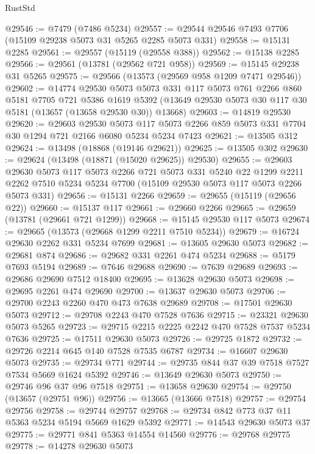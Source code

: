 \begin{lexlean}{RustStd}
\begin{coremodule}
@29546 := @7479 (@7486 @5234)
@29557 := @29544 @29546 @7493 @7706 (@15109 @29238 @5073 @31 @5265 @2285 @5073 @331)
@29558 := @15131 @2285
@29561 := @29557 (@15119 (@29558 @388))
@29562 := @15138 @2285
@29566 := @29561 (@13781 (@29562 @721 @958))
@29569 := @15145 @29238 @31 @5265
@29575 := @29566 (@13573 (@29569 @958 @1209 @7471 @29546))
@29602 := @14774
    @29530
    @5073
    @5073
    @331
    @117
    @5073
    @761
    @2266
    @860
    @5181
    @7705
    @721
    @5386
    @1619
    @5392
    (@13649 @29530 @5073 @30 @117 @30 @5181 (@13657 (@13658 @29530 @30)) @13668)
@29603 := @14819 @29530
@29620 := @29603
    @29530
    @5073
    @117
    @5073
    @2266
    @859
    @5073
    @331
    @7704
    @30
    @1294
    @721
    @2166
    @6080
    @5234
    @5234
    @7423
@29621 := @13505 @312
@29624 := @13498 (@18868 (@19146 @29621))
@29625 := @13505 @302
@29630 := @29624 (@13498 (@18871 (@15020 @29625)) @29530)
@29655 := @29603
    @29630
    @5073
    @117
    @5073
    @2266
    @721
    @5073
    @331
    @5240
    @22
    @1299
    @2211
    @2262
    @7510
    @5234
    @5234
    @7700
    (@15109 @29530 @5073 @117 @5073 @2266 @5073 @331)
@29656 := @15131 @2266
@29659 := @29655 (@15119 (@29656 @22))
@29660 := @15137 @117
@29661 := @29660 @2266
@29665 := @29659 (@13781 (@29661 @721 @1299))
@29668 := @15145 @29530 @117 @5073
@29674 := @29665 (@13573 (@29668 @1299 @2211 @7510 @5234))
@29679 := @16724 @29630 @2262 @331 @5234 @7699
@29681 := @13605 @29630 @5073
@29682 := @29681 @874
@29686 := @29682 @331 @2261 @474 @5234
@29688 := @5179 @7693 @5194
@29689 := @7646 @29688
@29690 := @7639 @29689
@29693 := @29686 @29690 @7512 @18400
@29695 := @13628 @29630 @5073
@29698 := @29695 @2261 @474 @29690
@29700 := @13637 @29630 @5073
@29706 := @29700 @2243 @2260 @470 @473 @7638 @29689
@29708 := @17501 @29630 @5073
@29712 := @29708 @2243 @470 @7528 @7636
@29715 := @23321 @29630 @5073 @5265
@29723 := @29715 @2215 @2225 @2242 @470 @7528 @7537 @5234 @7636
@29725 := @17511 @29630 @5073
@29726 := @29725 @1872
@29732 := @29726 @2214 @645 @140 @7528 @7535 @6787
@29734 := @16607 @29630 @5073
@29735 := @29734 @771
@29744 := @29735 @844 @37 @39 @7518 @7527 @7534 @5669 @1624 @5392
@29746 := @13649 @29630 @5073
@29750 := @29746 @96 @37 @96 @7518
@29751 := @13658 @29630
@29754 := @29750 (@13657 (@29751 @96))
@29756 := @13665 (@13666 @7518)
@29757 := @29754 @29756
@29758 := @29744 @29757
@29768 := @29734 @842 @773 @37 @11 @5363 @5234 @5194 @5669 @1629 @5392
@29771 := @14543 @29630 @5073 @37
@29775 := @29771 @841 @5363 @14554 @14560
@29776 := @29768 @29775
@29778 := @14278 @29630 @5073

\end{coremodule}
\end{lexlean}
